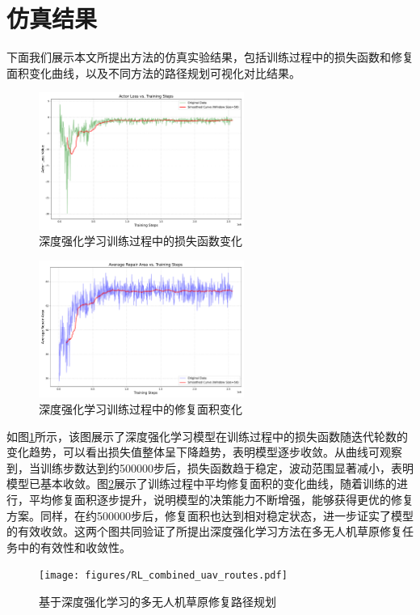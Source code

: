 \documentclass[AutoFakeBold]{LZUThesis}
\begin{document}
\section{仿真结果}


下面我们展示本文所提出方法的仿真实验结果，包括训练过程中的损失函数和修复面积变化曲线，以及不同方法的路径规划可视化对比结果。

\begin{figure}[H]
	\centering
	\includegraphics[width=0.6\textwidth]{figures/actor_loss_curve.pdf}
	\caption{深度强化学习训练过程中的损失函数变化}
	\label{fig:training_loss_curve}
\end{figure}

\begin{figure}[H]
	\centering
	\includegraphics[width=0.6\textwidth]{figures/avg_repair_area_curve.pdf}
	\caption{深度强化学习训练过程中的修复面积变化}
	\label{fig:training_reward_curve}
\end{figure}

如图\ref{fig:training_loss_curve}所示，该图展示了深度强化学习模型在训练过程中的损失函数随迭代轮数的变化趋势，可以看出损失值整体呈下降趋势，表明模型逐步收敛。从曲线可观察到，当训练步数达到约500000步后，损失函数趋于稳定，波动范围显著减小，表明模型已基本收敛。图\ref{fig:training_reward_curve}展示了训练过程中平均修复面积的变化曲线，随着训练的进行，平均修复面积逐步提升，说明模型的决策能力不断增强，能够获得更优的修复方案。同样，在约500000步后，修复面积也达到相对稳定状态，进一步证实了模型的有效收敛。这两个图共同验证了所提出深度强化学习方法在多无人机草原修复任务中的有效性和收敛性。
\begin{figure}[H]
	\centering
	\texttt{[image: figures/RL\_combined\_uav\_routes.pdf]}
	\caption{基于深度强化学习的多无人机草原修复路径规划}
	\label{fig:RL_combined_uav_routes}
\end{figure}
\end{document}
